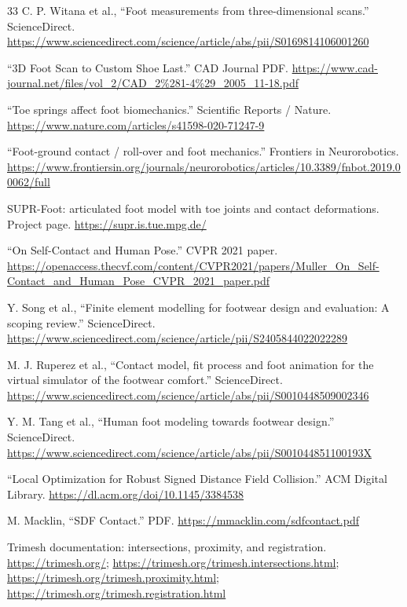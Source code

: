 \documentclass[11pt]{article}
\begin{document}
\begin{thebibliography}{33}
C. P. Witana et al.,
``Foot measurements from three-dimensional scans.''
ScienceDirect.
\url{https://www.sciencedirect.com/science/article/abs/pii/S0169814106001260}

``3D Foot Scan to Custom Shoe Last.''
CAD Journal PDF.
\url{https://www.cad-journal.net/files/vol_2/CAD_2%281-4%29_2005_11-18.pdf}

``Toe springs affect foot biomechanics.''
Scientific Reports / Nature.
\url{https://www.nature.com/articles/s41598-020-71247-9}

``Foot-ground contact / roll-over and foot mechanics.''
Frontiers in Neurorobotics.
\url{https://www.frontiersin.org/journals/neurorobotics/articles/10.3389/fnbot.2019.00062/full}

SUPR-Foot: articulated foot model with toe joints and contact deformations.
Project page.
\url{https://supr.is.tue.mpg.de/}

``On Self-Contact and Human Pose.''
CVPR 2021 paper.
\url{https://openaccess.thecvf.com/content/CVPR2021/papers/Muller_On_Self-Contact_and_Human_Pose_CVPR_2021_paper.pdf}

Y. Song et al.,
``Finite element modelling for footwear design and evaluation: A scoping review.''
ScienceDirect.
\url{https://www.sciencedirect.com/science/article/pii/S2405844022022289}

M. J. Ruperez et al.,
``Contact model, fit process and foot animation for the virtual simulator of the footwear comfort.''
ScienceDirect.
\url{https://www.sciencedirect.com/science/article/abs/pii/S0010448509002346}

Y. M. Tang et al.,
``Human foot modeling towards footwear design.''
ScienceDirect.
\url{https://www.sciencedirect.com/science/article/abs/pii/S001044851100193X}

``Local Optimization for Robust Signed Distance Field Collision.''
ACM Digital Library.
\url{https://dl.acm.org/doi/10.1145/3384538}

M. Macklin,
``SDF Contact.''
PDF.
\url{https://mmacklin.com/sdfcontact.pdf}

Trimesh documentation: intersections, proximity, and registration.
\url{https://trimesh.org/};
\url{https://trimesh.org/trimesh.intersections.html};
\url{https://trimesh.org/trimesh.proximity.html};
\url{https://trimesh.org/trimesh.registration.html}


\end{thebibliography}
\end{document}
